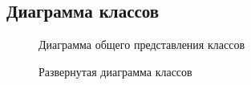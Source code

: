 
\begin{landscape}
	\chapter{Диаграмма классов}
	\label{cha:appendix1}

	\begin{figure}
		\centering
		
		\caption{Диаграмма общего представления классов}
	\end{figure}
\end{landscape}

\begin{landscape}
	\begin{figure}
		\centering
		
		\caption{Развернутая диаграмма классов}
	\end{figure}
\end{landscape}


